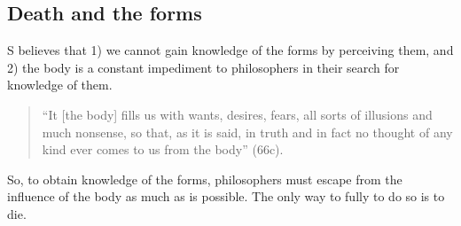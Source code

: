 \subsection*{Death and the forms}
S believes that 1) we cannot gain knowledge of the forms by perceiving them, and 2) the body is a constant impediment to philosophers in their search for knowledge of them. 
\begin{quote}
``It [the body] fills us with wants, desires, fears, all sorts of illusions and much nonsense, so that, as it is said, in truth and in fact no thought of any kind ever comes to us from the body'' (66c). 
\end{quote} 
So, to obtain knowledge of the forms, philosophers must escape from the influence of the
body as much as is possible. The only way to fully to do so is to die. 

